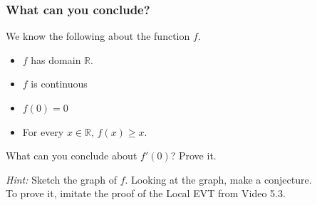 \documentclass[14pt]{beamer}
\newcommand {\R}{\mathbb{R}}
\begin{document}
\begin{frame}[t]
\frametitle{What can you conclude?}

We know the following about the function $f$.
	\begin{itemize}	
		\item  $f$ has domain $\R$.
		\item  $f$ is continuous
		\item  $f(0)=0$
		\item  For every $x \in \R$, $f(x) \geq x$.
 	\end{itemize}
\begin{block}{}
What can you conclude about $f'(0)$?  Prove it.
\end{block}

\vfill

\emph{Hint:}  Sketch the graph of $f$.   Looking at the graph, make a conjecture. \\
To prove it, imitate the proof of the Local EVT from Video 5.3.



\end{frame}
\end{document}
